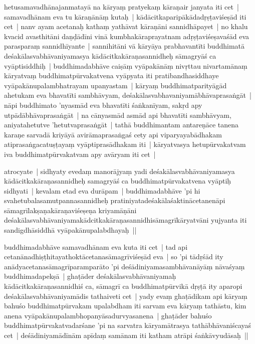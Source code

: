 \documentclass[article,12pt,a4paper]{memoir}
\begin{document}
	  \pstart hetusamavadhānajanmatayā na kāryaṃ pratyekaṃ kāraṇair janyata iti cet | samavadhānam eva tu kāraṇānāṃ kutaḥ | kādācitkaparipākādadṛṣṭaviśeṣād iti cet | nanv ayam acetanaḥ kathaṃ yathāvat kāraṇāni sannidhāpayet | no khalu kvacid avasthitāni daṇḍādīni vinā kumbhakāraprayatnam adṛṣṭaviśeṣavaśād eva parasparaṃ sannidhīyante | sannihitāni vā kāryāya prabhavantīti buddhimatā deśakālasvabhāvaniyamasya kādācitkakāraṇasannidheḥ sāmagryāś ca vyāptisiddhiḥ | buddhimadabhāve caiṣāṃ vyāpakānāṃ nivṛttau nivartamānaṃ kāryatvaṃ buddhimatpūrvakatvena vyāpyata iti pratibandhasiddhaye vyāpakānupalambhatrayam upanyastam |  kāryaṃ buddhimatparityāgād ahetukam eva bhavatīti sambhāvyam, deśakālasvabhavaniyamābhāvaprasaṅgāt | nāpi buddhimato 'nyasmād eva bhavatīti śaṅkanīyam, sakṛd apy utpādābhāvaprasaṅgāt | na cānyasmād asmād api bhavatīti sambhāvyam, aniyatahetutve 'hetutvaprasaṅgāt | tathā buddhimantam antareṇāce tanena karaṇe sarvadā kriyāyā avirāmaprasaṅgaś cety api viparyayabādhakam atiprasaṅgacatuṣṭayaṃ vyāptiprasādhakam iti | kāryatvasya hetupūrvakatvam iva buddhimatpūrvakatvam apy avāryam iti cet |
	\pend
      

	  \pstart atrocyate | sidhyaty evedaṃ manorājyaṃ yadi deśakālasvabhāvaniyamasya kādācitkakāraṇasannidheḥ samagryāś ca buddhimatpūrvakatvena vyāptiḥ sidhyati | kevalam etad eva durāpam | buddhimadabhāve 'pi hi svahetubalasamutpannasannidheḥ pratiniyatadeśakālaśaktinācetanenāpi sāmagrīlakṣaṇakāraṇaviśeṣeṇa kriyamāṇāni deśakālasvabhāvaniyamakādcitkakāraṇasannidhisāmagrīkāryatvāni yujyanta iti sandigdhāsiddhā vyāpakānupalabdhayaḥ ||
	\pend
      

	  \pstart buddhimadabhāve samavadhānam eva kuta iti cet | tad api cetanānadhiṣṭhitayathoktācetanasāmagrīviśeṣād eva | so 'pi tādṛśād ity anādyacetanasāmagrīparamparāto 'pi deśādiniyamasambhāvanāyāṃ nāvaśyaṃ buddhimadapekṣā | ghaṭāder deśakālasvabhāvaniyamaḥ kādācitkakāraṇasannidhiś ca, sāmagrī ca buddhimatpūrvikā dṛṣṭā ity aparopi deśakālasvabhāvaniyamādis tathaiveti cet | yady evaṃ ghaṭādikam api kāryaṃ bahuśo buddhimatpūrvakam upalabdham iti sarvam eva kāryaṃ tathāstu, kim anena vyāpakānupalambhopanyāsadurvyasanena | ghaṭāder bahuśo buddhimatpūrvakatvadarśane 'pi na sarvatra kāryamātrasya tathābhāvaniścayaś cet | deśādiniyamādīnām apīdaṃ samānam iti katham atrāpi śaṅkāvyudāsaḥ ||
	\pend
      
\end{document}
